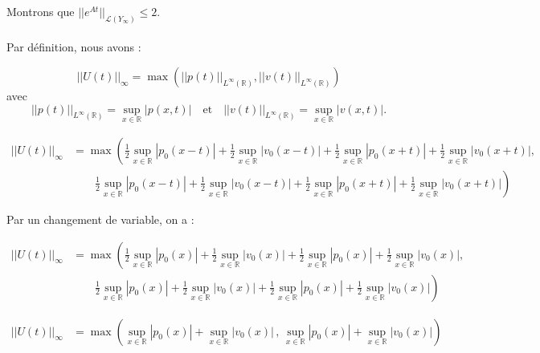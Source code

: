 \documentclass[a4paper,11pt]{article}
\begin{document}
Montrons que $||e^{At}||_{\mathcal{L}(Y_{\infty})} \leq 2$.\\ \\
Par d\'efinition, nous avons :

\begin{displaymath}
    ||U(t)||_{\infty}=\max(||p(t)||_{L^{\infty}(\mathbb{R})},||v(t)||_{L^{\infty}(\mathbb{R})})
\end{displaymath}
avec
\begin{displaymath}
    ||p(t)||_{L^{\infty}(\mathbb{R})}=\sup_{x\in \mathbb{R}}|p(x,t)| \quad \mbox{et} \quad ||v(t)||_{L^{\infty}(\mathbb{R})}=\sup_{x\in \mathbb{R}}|v(x,t)|.
\end{displaymath}

\begin{displaymath}
    \begin{split}
        ||U(t)||_{\infty} &= \max \left( \frac{1}{2}\sup_{x \in \mathbb{R}}|p_0(x-t)| + \frac{1}{2}\sup_{x \in \mathbb{R}} |v_0(x-t)| + \frac{1}{2}\sup_{x \in \mathbb{R}}|p_0(x+t)| + \frac{1}{2}\sup_{x \in \mathbb{R}}|v_0(x+t)| \right. , \\
        & \qquad \left. \frac{1}{2}\sup_{x \in \mathbb{R}}|p_0(x-t)| + \frac{1}{2}\sup_{x \in \mathbb{R}}|v_0(x-t)| + \frac{1}{2}\sup_{x \in \mathbb{R}}|p_0(x+t)| + \frac{1}{2}\sup_{x \in \mathbb{R}}|v_0(x+t)| \right)
    \end{split}
\end{displaymath}


Par un changement de variable, on a :

\begin{displaymath}
    \begin{split}
        ||U(t)||_{\infty} &= \max \left( \frac{1}{2}\sup_{x \in \mathbb{R}}|p_0(x)| + \frac{1}{2}\sup_{x \in \mathbb{R}} |v_0(x)| + \frac{1}{2}\sup_{x \in \mathbb{R}}|p_0(x)| + \frac{1}{2}\sup_{x \in \mathbb{R}}|v_0(x)| \right. , \\
        & \qquad \left. \frac{1}{2}\sup_{x \in \mathbb{R}}|p_0(x)| + \frac{1}{2}\sup_{x \in \mathbb{R}}|v_0(x)| + \frac{1}{2}\sup_{x \in \mathbb{R}}|p_0(x)| + \frac{1}{2}\sup_{x \in \mathbb{R}}|v_0(x)| \right)
    \end{split}
\end{displaymath}

\begin{displaymath}
    \begin{split}
        ||U(t)||_{\infty} &= \max \left( \sup_{x \in \mathbb{R}}|p_0(x)| + \sup_{x \in \mathbb{R}} |v_0(x)| \, , \,
        \sup_{x \in \mathbb{R}}|p_0(x)| + \sup_{x \in \mathbb{R}}|v_0(x)| \right)
    \end{split}
\end{displaymath}
\end{document}
